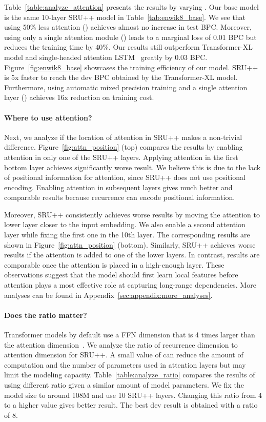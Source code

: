 Table~\ref{table:analyze_attention} presents the results by varying .
Our base model is the same 10-layer SRU++ model in Table~\ref{tab:enwik8_base}.
We see that using 50\% less attention () achieves almost no increase in test BPC.
Moreover, using only a single attention module () leads to a marginal loss of 0.01 BPC but reduces the training time by 40\%. 
Our results still outperform Transformer-XL model and single-headed attention LSTM~\cite{merity2019single} greatly by 0.03 BPC.
Figure~\ref{fig:enwik8_base} showcases the training efficiency of our model.
SRU++ is 5x faster to reach the dev BPC obtained by the Transformer-XL model.
Furthermore, using automatic mixed precision training and a single attention layer () achieves 16x reduction on training cost.

\paragraph{Where to use attention?}
Next, we analyze if the location of attention in SRU++ makes a non-trivial difference.
Figure~\ref{fig:attn_position} (top) compares the results by enabling attention in only one of the SRU++ layers. 
Applying attention in the first bottom layer achieves significantly worse result. 
We believe this is due to the lack of positional information for attention, since SRU++ does not use positional encoding.
Enabling attention in subsequent layers gives much better and comparable results because recurrence can encode positional information.

Moreover, SRU++ consistently achieves worse results by moving the attention to lower layer closer to the input embedding.
We also enable a second attention layer while fixing the first one in the 10th layer.
The corresponding results are shown in Figure~\ref{fig:attn_position} (bottom).
Similarly, SRU++ achieves worse results if the attention is added to one of the lower layers.
In contrast, results are comparable once the attention is placed in a high-enough layer.
These observations suggest that the model should first learn local features before attention plays a most effective role at capturing long-range dependencies.
More analyses can be found in Appendix~\ref{sec:appendix:more_analyses}.

\paragraph{Does the ratio  matter?}
Transformer models by default use a FFN dimension that is 4 times larger than the attention dimension~\cite{vaswani2017attention}.
We analyze the ratio of recurrence dimension  to attention dimension  for SRU++.
A small value of  can reduce the amount of computation and the number of parameters used in attention layers but may limit the modeling capacity.
Table~\ref{table:analyze_ratio} compares the results of using different  ratio given a similar amount of model parameters.
We fix the model size to around 108M and use 10 SRU++ layers. 
Changing this ratio from 4 to a higher value gives better result.
The best dev result is obtained with a ratio of 8.


